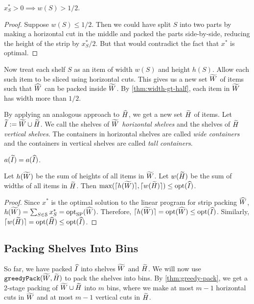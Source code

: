 \begin{lemma}
\label{thm:width-gt-half}
$x_S^* > 0 \implies w(S) > 1/2$.
\end{lemma}
\begin{proof}
Suppose $w(S) \le 1/2$. Then we could have split $S$ into two parts by making a horizontal cut
in the middle and packed the parts side-by-side, reducing the height of the strip by $x^*_S/2$.
But that would contradict the fact that $x^*$ is optimal.
\end{proof}

Now treat each shelf $S$ as an item of width $w(S)$ and height $h(S)$.
Allow each such item to be sliced using horizontal cuts.
This gives us a new set $\widetilde{W}$ of items such that $\widehat{W}$ can be packed inside $\widetilde{W}$.
By \cref{thm:width-gt-half}, each item in $\widetilde{W}$ has width more than $1/2$.

By applying an analogous approach to $\widehat{H}$, we get a new set $\widetilde{H}$ of items.
Let $\widetilde{I} := \widetilde{W} \cup \widetilde{H}$.
We call the shelves of $\widetilde{W}$ \emph{horizontal shelves} and the shelves of $\widetilde{H}$
\emph{vertical shelves}. The containers in horizontal shelves are called \emph{wide containers}
and the containers in vertical shelves are called \emph{tall containers}.

\begin{claim}
\label{thm:area-eq}
$a(\widetilde{I}) = a(\widehat{I})$.
\end{claim}
\begin{lemma}
\label{thm:hw-opt}
Let $h(\widetilde{W})$ be the sum of heights of all items in $\widetilde{W}$.
Let $w(\widetilde{H})$ be the sum of widths of all items in $\widetilde{H}$.
Then $\max(\lceil h(\widetilde{W}) \rceil, \lceil w(\widetilde{H}) \rceil) \le \operatorname{opt}(\widehat{I})$.
\end{lemma}
\begin{proof}
Since $x^*$ is the optimal solution to the linear program for strip packing $\widehat{W}$,
$h(\widetilde{W}) = \sum_{S \in \mathcal{S}} x^*_S = \operatorname{opt}_{\mathrm{SP}}(\widehat{W})$.
Therefore, $\lceil h(\widetilde{W}) \rceil = \operatorname{opt}(\widehat{W}) \le \operatorname{opt}(\widehat{I})$.
Similarly, $\lceil w(\widetilde{H}) \rceil = \operatorname{opt}(\widehat{H}) \le \operatorname{opt}(\widehat{I})$.
\end{proof}

\subsection{Packing Shelves Into Bins}
\label{sec:bp-algo:pack-shelves-into-bins}

So far, we have packed $\widehat{I}$ into shelves $\widetilde{W}$ and $\widetilde{H}$.
We will now use $\operatorname{\mathtt{greedyPack}}(\widetilde{W}, \widetilde{H})$ to pack the shelves into bins.
By \cref{thm:greedy-pack}, we get a 2-stage packing of $\widetilde{W} \cup \widetilde{H}$
into $m$ bins, where we make at most $m-1$ horizontal cuts in $\widetilde{W}$
and at most $m-1$ vertical cuts in $\widetilde{H}$.

